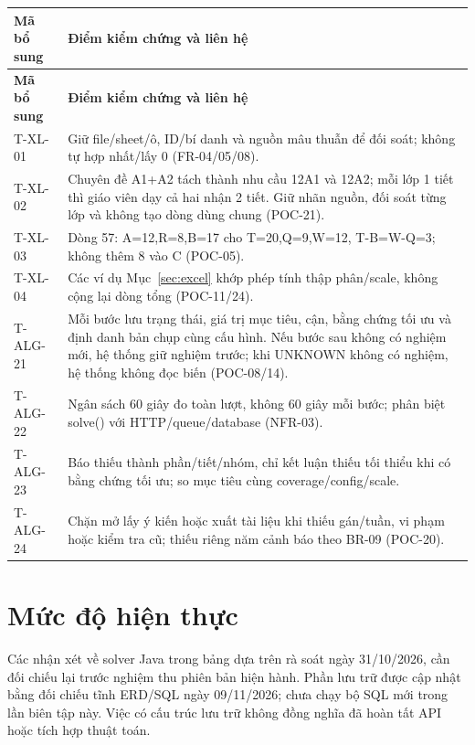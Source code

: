 \documentclass[12pt,a4paper]{report}
\begin{document}
\begin{longtable}{|p{2.3cm}|p{11.6cm}|}
\hline
\textbf{Mã bổ sung} & \textbf{Điểm kiểm chứng và liên hệ} \\\hline
\endfirsthead
\hline
\textbf{Mã bổ sung} & \textbf{Điểm kiểm chứng và liên hệ} \\\hline
\endhead
T-XL-01 & Giữ file/sheet/ô, ID/bí danh và nguồn mâu thuẫn để đối soát; không tự hợp nhất/lấy 0 (FR-04/05/08). \\\hline
T-XL-02 & Chuyên đề A1+A2 tách thành nhu cầu 12A1 và 12A2; mỗi lớp 1 tiết thì giáo viên dạy cả hai nhận 2 tiết. Giữ nhãn nguồn, đối soát từng lớp và không tạo dòng dùng chung (POC-21). \\\hline
T-XL-03 & Dòng 57: A=12,R=8,B=17 cho T=20,Q=9,W=12, T-B=W-Q=3; không thêm 8 vào C (POC-05). \\\hline
T-XL-04 & Các ví dụ Mục~\ref{sec:excel} khớp phép tính thập phân/scale, không cộng lại dòng tổng (POC-11/24). \\\hline
T-ALG-21 & Mỗi bước lưu trạng thái, giá trị mục tiêu, cận, bằng chứng tối ưu và định danh bản chụp cùng cấu hình. Nếu bước sau không có nghiệm mới, hệ thống giữ nghiệm trước; khi UNKNOWN không có nghiệm, hệ thống không đọc biến (POC-08/14). \\\hline
T-ALG-22 & Ngân sách 60 giây đo toàn lượt, không 60 giây mỗi bước; phân biệt solve() với HTTP/queue/database (NFR-03). \\\hline
T-ALG-23 & Báo thiếu thành phần/tiết/nhóm, chỉ kết luận thiếu tối thiểu khi có bằng chứng tối ưu; so mục tiêu cùng coverage/config/scale. \\\hline
T-ALG-24 & Chặn mở lấy ý kiến hoặc xuất tài liệu khi thiếu gán/tuần, vi phạm hoặc kiểm tra cũ; thiếu riêng năm cảnh báo theo BR-09 (POC-20). \\\hline
\end{longtable}


\section{Mức độ hiện thực}\label{sec:implementation-audit}
Các nhận xét về solver Java trong bảng dựa trên rà soát ngày 31/10/2026, cần đối chiếu lại trước nghiệm thu phiên bản hiện hành. Phần lưu trữ được cập nhật bằng đối chiếu tĩnh ERD/SQL ngày 09/11/2026; chưa chạy bộ SQL mới trong lần biên tập này. Việc có cấu trúc lưu trữ không đồng nghĩa đã hoàn tất API hoặc tích hợp thuật toán.
\end{document}
